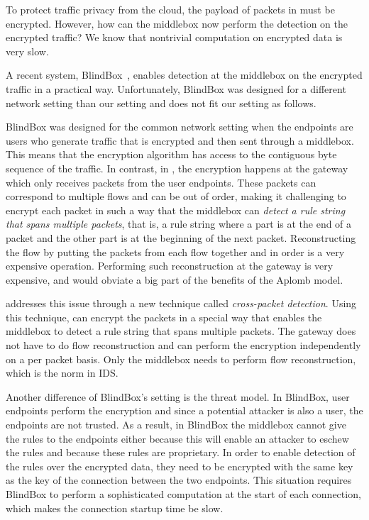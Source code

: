 To protect traffic privacy from the cloud, the payload of packets in \sys must be encrypted. 
However, how can the middlebox now perform the detection on the encrypted traffic? 
We know that nontrivial computation on encrypted data is very slow. ~\cite{CITE}

A recent system, BlindBox~,  enables detection at the middlebox on the encrypted traffic
in a practical way. 
Unfortunately, BlindBox was designed for a different network setting than our setting 
and does not fit our setting  as follows.


BlindBox was designed for the common network setting when the endpoints are users who generate
traffic that is encrypted and then sent through a middlebox. This means that the encryption algorithm
has access to the contiguous byte sequence of the traffic. In contrast, in \sys, the encryption 
happens at the gateway 
which only receives packets from the user endpoints. 
These packets can correspond to multiple flows and can be out of order, 
making it challenging to encrypt each packet in such a way that the middlebox can  {\em detect 
a rule string that spans multiple packets}, that is, a rule string where a part is at the end of a packet and the other part is at the beginning of the next packet.  Reconstructing the flow by putting the packets from each flow together and in order  is a very expensive 
operation. Performing such reconstruction at the gateway is 
very expensive, and would obviate a big part of the benefits of the Aplomb model. 


\sys addresses this issue through a new technique called {\em cross-packet detection}. Using this technique,
\sys can encrypt the packets in a special way that enables the middlebox to detect a rule string that spans multiple
packets. The gateway does not have to do flow reconstruction and can perform the encryption 
independently on a per packet basis. Only the middlebox
needs to perform flow reconstruction, which is the norm in IDS. 


Another difference of BlindBox's setting is the threat model. In BlindBox, user
endpoints perform the encryption and since a potential attacker is also a user, 
the endpoints are not trusted. As a result, in BlindBox the middlebox cannot
give the rules to the endpoints either because this will enable an attacker to eschew the
rules and because these rules are proprietary. In order to enable detection of the rules
over the encrypted data, they need to be encrypted with the same key as the 
key of the connection between the two endpoints. This situation requires BlindBox to perform
a sophisticated computation at the start of each connection, which makes the connection
startup time be slow. 


